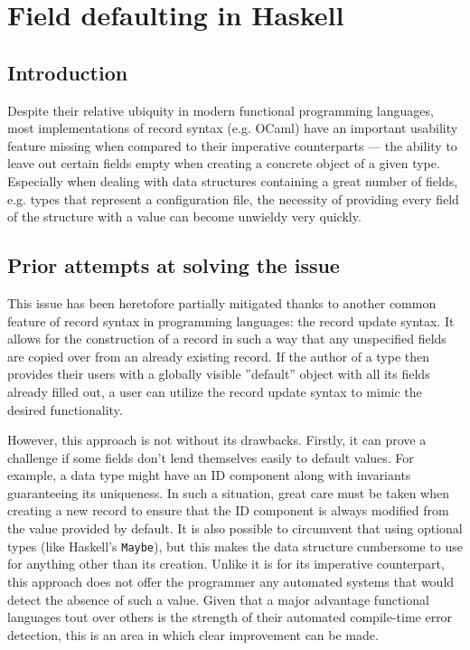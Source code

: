 \documentclass[en]{pracamgr}
\begin{document}
\section{Field defaulting in Haskell}
\subsection{Introduction}
Despite their relative ubiquity in modern functional programming languages, most implementations
of record syntax (e.g. OCaml) have an important usability feature missing when compared
to their imperative counterparts --- the ability to leave out certain fields empty
when creating a concrete object of a given type. Especially when dealing with
data structures containing a great number of fields, e.g. types that represent
a configuration file, the necessity of providing every field 
of the structure with a value can become unwieldy very quickly. 

\subsection{Prior attempts at solving the issue}
This issue has been heretofore partially mitigated thanks to another common feature of record syntax in programming languages: the record update syntax. 
It allows for the construction of a record in such a way that any unspecified fields are copied over from an already existing record. 
If the author of a type then provides their users with a globally visible ''default'' object with all its fields already filled out, a user can utilize the record update syntax to mimic the desired functionality.

However, this approach is not without its drawbacks.
Firstly, it can prove a challenge if some fields don't lend themselves easily to default values. 
For example, a data type might have an ID component along with invariants guaranteeing its uniqueness. 
In such a situation, great care must be taken when creating a new record to ensure that the ID component is always modified from the value provided by default.
It is also possible to circumvent that using optional types (like Haskell's \texttt{Maybe}), but this makes the data structure cumbersome to use for anything other than its creation.
Unlike it is for its imperative counterpart, this approach does not offer the programmer any automated systems that would detect the absence of such a value.
Given that a major advantage functional languages tout over others is the strength of their automated compile-time error detection, this is an area in which clear improvement can be made.
\end{document}
